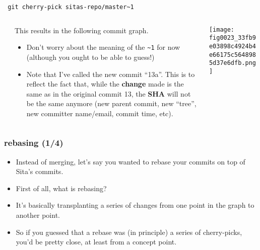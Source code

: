 \documentclass[presentation]{beamer}
\begin{document}
\begin{frame}[fragile]

\small
\begin{verbatim}
 git cherry-pick sitas-repo/master~1
\end{verbatim}
\begin{columns} %
\label{sec-8-7-1}
\begin{column}{0.5\textwidth}
\label{sec-8-7-1-1}


\small

This results in the following commit graph.

\tiny

\begin{itemize}
\item Don't worry about the meaning of the \texttt{\textasciitilde{}1} for now (although you ought to be
  able to guess!)
\end{itemize}


\begin{itemize}
\item Note that I've called the new commit ``13a''.  This is to reflect the fact that,
  while the \textbf{change} made is the same as in the original commit 13, the \textbf{SHA}
  will not be the same anymore (new parent commit, new ``tree'', new committer
  name/email, commit time, etc).
\end{itemize}
\end{column}
\begin{column}{0.5\textwidth}
\label{sec-8-7-1-2}



\texttt{[image: fig0023\_33fb9e03898c4924b4e66175c5648985d37e6dfb.png]}
\end{column}
\end{columns}
\end{frame}
\begin{frame}
\frametitle{rebasing (1/4)}
\label{sec-8-8}



\begin{itemize}
\item Instead of merging, let's say you wanted to rebase your commits on top of
  Sita's commits.
\item First of all, what is rebasing?
\item It's basically transplanting a series of
  changes from one point in the graph to another point.
\item So if you guessed that a rebase was (in principle) a series of cherry-picks,
  you'd be pretty close, at least from a concept point.
\end{itemize}
\end{frame}
\end{document}
